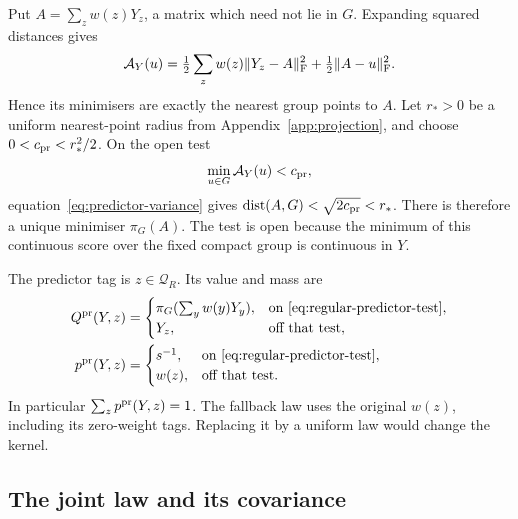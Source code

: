 \documentclass[11pt,reqno]{amsart}
\numberwithin{equation}{section}
\theoremstyle{definition}
\theoremstyle{remark}
\begin{document}
Put \(A=\sum_z w(z)Y_z\), a matrix which need not lie in \(G\).
Expanding squared distances gives
\begin{equation}
 \mathcal A_Y(u)
     =\tfrac12\sum_z w(z)\|Y_z-A\|_{\rm F}^2
                       +\tfrac12\|A-u\|_{\rm F}^2.
 \label{eq:predictor-variance}
\end{equation}
Hence its minimisers are exactly the nearest group points to \(A\).
Let \(r_*>0\) be a uniform nearest-point radius from
Appendix~\ref{app:projection}, and choose
\(0<c_{\rm pr}<r_*^2/2\). On the open test
\begin{equation}
                        \min_{u\in G}\mathcal A_Y(u)<c_{\rm pr},
 \label{eq:regular-predictor-test}
\end{equation}
equation~\eqref{eq:predictor-variance} gives
\(\operatorname{dist}(A,G)<\sqrt{2c_{\rm pr}}<r_*\).
There is therefore a unique minimiser \(\pi_G(A)\).
The test is open because the minimum of this continuous score
over the fixed compact group is continuous in \(Y\).

The predictor tag is \(z\in\mathcal Q_R\). Its value and mass are
\begin{equation}
 \begin{split}
 Q^{\rm pr}(Y,z)&=
 \begin{cases}
  \pi_G(\sum_y w(y)Y_y),&\text{on }\eqref{eq:regular-predictor-test},\\
  Y_z,&\text{off that test},
 \end{cases}\\
 p^{\rm pr}(Y,z)&=
 \begin{cases}
  s^{-1},&\text{on }\eqref{eq:regular-predictor-test},\\
  w(z),&\text{off that test}.
 \end{cases}
 \end{split}
 \label{eq:predictor-law}
\end{equation}
In particular \(\sum_z p^{\rm pr}(Y,z)=1\). The fallback law uses
the original \(w(z)\), including its zero-weight tags. Replacing
it by a uniform law would change the kernel.

\subsection{The joint law and its covariance}
\end{document}
